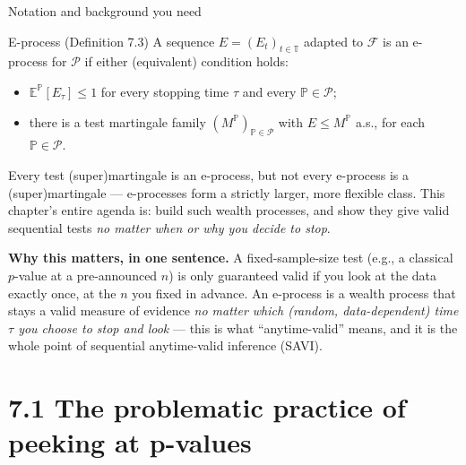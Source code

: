\documentclass[aspectratio=169,10pt]{beamer}
\begin{document}
\begin{frame}[allowframebreaks]{Notation and background you need}
\begin{block}{E-process (Definition 7.3)}
A sequence $E = (E_t)_{t\in\mathbb T}$ adapted to $\mathcal F$ is an e-process for $\mathcal P$ if either
(equivalent) condition holds:
\begin{itemize}
\item[(a)] $\mathbb{E}^{\mathbb{P}}[E_\tau] \le 1$ for every stopping time $\tau$ and every $\mathbb{P}\in\mathcal P$;
\item[(b)] there is a test martingale family $(M^{\mathbb P})_{\mathbb P \in \mathcal P}$ with $E \le M^{\mathbb P}$
a.s., for each $\mathbb P \in \mathcal P$.
\end{itemize}
\end{block}
Every test (super)martingale is an e-process, but not every e-process is a (super)martingale --- e-processes form
a strictly larger, more flexible class. This chapter's entire agenda is: build such wealth processes, and show they
give valid sequential tests \emph{no matter when or why you decide to stop}.

\framebreak

\textbf{Why this matters, in one sentence.} A fixed-sample-size test (e.g., a classical $p$-value at a
pre-announced $n$) is only guaranteed valid if you look at the data exactly once, at the $n$ you fixed in advance.
An e-process is a wealth process that stays a valid measure of evidence \emph{no matter which (random,
data-dependent) time $\tau$ you choose to stop and look} --- this is what ``anytime-valid'' means, and it is the
whole point of sequential anytime-valid inference (SAVI).

\end{frame}

\section{7.1 The problematic practice of peeking at p-values}
\end{document}
